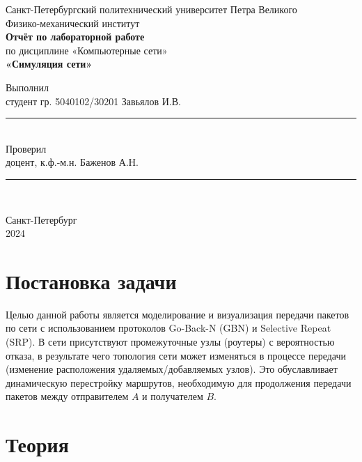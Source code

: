 \documentclass[a4paper,14pt]{extarticle}
\begin{document}
\begin{titlepage}
    \begin{center}
        Санкт-Петербургский политехнический университет Петра Великого\\
        Физико-механический институт\\[4cm]
        
        \textbf{Отчёт по лабораторной работе}\\[0.5cm]
        по дисциплине «Компьютерные сети»\\[0.5cm]
        \textbf{«Симуляция сети»}\\[4cm]
        
        \begin{flushleft}
            Выполнил\\
            студент гр. 5040102/30201 \hfill Завьялов И.В. \hfill \rule{3cm}{0.1pt} \\[1.5cm]
            Проверил\\
            доцент, к.ф.-м.н. \hfill \hspace{1.5cm} Баженов А.Н. \hfill \rule{3cm}{0.1pt} \\[1.5cm]
        \end{flushleft}
        
        \vfill
        Санкт-Петербург\\
        2024
    \end{center}
\end{titlepage}

\newpage

\tableofcontents

\newpage
\section{Постановка задачи}

Целью данной работы является моделирование и визуализация передачи пакетов по сети с использованием протоколов Go-Back-N (GBN) и Selective Repeat (SRP). В сети присутствуют промежуточные узлы (роутеры) с вероятностью отказа, в результате чего топология сети может изменяться в процессе передачи (изменение расположения удаляемых/добавляемых узлов). Это обуславливает динамическую перестройку маршрутов, необходимую для продолжения передачи пакетов между отправителем $A$ и получателем $B$.


\section{Теория}
\end{document}
